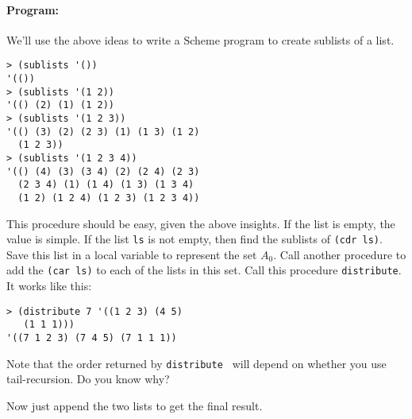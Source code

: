 \documentclass[letterpaper,12pt]{article}
\begin{document}
\begin{multicols}{2}
  \paragraph{Program:} We'll use the above ideas to write a Scheme
  program to create sublists of a list.
  {\small
\begin{Verbatim}[frame=single]
> (sublists '())
'(())
> (sublists '(1 2))
'(() (2) (1) (1 2))
> (sublists '(1 2 3))
'(() (3) (2) (2 3) (1) (1 3) (1 2) 
  (1 2 3))
> (sublists '(1 2 3 4))
'(() (4) (3) (3 4) (2) (2 4) (2 3) 
  (2 3 4) (1) (1 4) (1 3) (1 3 4) 
  (1 2) (1 2 4) (1 2 3) (1 2 3 4))
\end{Verbatim}
  }
  This procedure should be easy, given the above insights.  If the list is empty,
  the value is simple.  If the list {\tt ls} is not empty, then find the sublists
  of {\tt (cdr ls)}.  Save this list in a local variable to represent the set
  $A_0$. Call another procedure to add the {\tt (car ls)} to each of the lists in
  this set.  Call this procedure {\tt distribute}.  It works like this:
  {\small
\begin{Verbatim}[frame=single]
> (distribute 7 '((1 2 3) (4 5) 
   (1 1 1)))
'((7 1 2 3) (7 4 5) (7 1 1 1))
\end{Verbatim}
  }
  Note that the order returned by {\tt distribute } will depend on
  whether you use tail-recursion.  Do you know why?  
  
  Now just append the two lists to get the final result.


\end{multicols}
\end{document}
